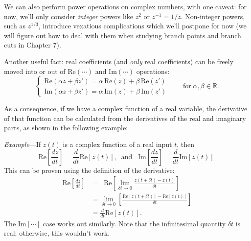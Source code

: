\documentclass[10pt,a4paper]{article}
\begin{document}
We can also perform power operations on complex numbers, with one
caveat: for now, we'll only consider \emph{integer} powers like $z^2$
or $z^{-1} = 1/z$. Non-integer powers, such as $z^{1/3}$, introduce
vexatious complications which we'll postpone for now (we will figure
out how to deal with them when studying branch points and branch cuts
in Chapter 7).

Another useful fact: real coefficients (and \emph{only} real
coefficients) can be freely moved into or out of $\textrm{Re}(\cdots)$
and $\textrm{Im}(\cdots)$ operations:
\begin{equation}
  \left\{\begin{array}{l}
  \mathrm{Re}(\alpha z + \beta z') = \alpha \, \mathrm{Re}(z) + \beta\, \mathrm{Re}(z')\\
  \mathrm{Im}(\alpha z + \beta z') = \alpha \, \mathrm{Im}(z) + \beta\, \mathrm{Im}(z')\end{array}\right.\qquad\mathrm{for}\;\alpha, \beta \in \mathbb{R}.
\end{equation}

As a consequence, if we have a complex function of a real variable, the
derivative of that function can be calculated from the derivatives of
the real and imaginary parts, as shown in the following example:

\begin{framed}\noindent
  \textit{Example}---If $z(t)$ is a complex function of a real input $t$, then
  \begin{equation}
    \mathrm{Re}\left[\frac{dz}{dt}\right] = \frac{d}{dt} \mathrm{Re}\left[z(t)\right], \;\;\textrm{and}\;\;\; \mathrm{Im}\left[\frac{dz}{dt}\right] = \frac{d}{dt} \mathrm{Im}\left[z(t)\right].
  \end{equation}
  This can be proven using the definition of the derivative:
  \begin{align}
    \mathrm{Re}\left[\frac{dz}{dt}\right]
    &= \;\; \mathrm{Re}\left[\lim_{\delta t \rightarrow 0} \frac{z(t+\delta t) - z(t)}{\delta t}\right] \\
    &= \lim_{\delta t \rightarrow 0} \left[\frac{\mathrm{Re}[z(t+\delta t)] - \mathrm{Re}[z(t)]}{\delta t}\right] \\
    &= \frac{d}{dt} \mathrm{Re}\left[z(t)\right].
  \end{align}
  The $\mathrm{Im}[\cdots]$ case works out similarly. Note that the
  infinitesimal quantity $\delta t$ is real; otherwise, this wouldn't
  work.
\end{framed}
\end{document}
